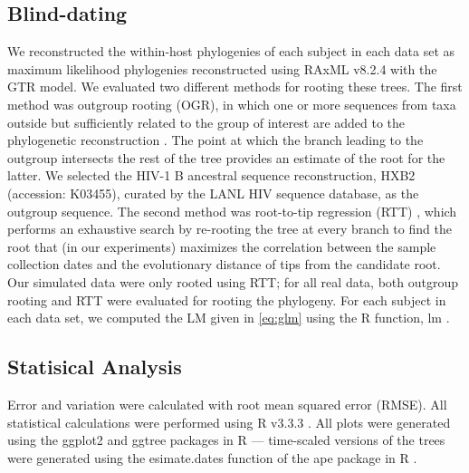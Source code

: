 \documentclass[12pt,onecolumn,twoside]{pnas-new}
\begin{document}
{\subsection*{Blind-dating}
We reconstructed the within-host phylogenies of each subject in each data set as maximum likelihood phylogenies reconstructed using RAxML v8.2.4 \cite{raxml} with the GTR model.
We evaluated two different methods for rooting these trees. 
The first method was outgroup rooting (OGR), in which one or more sequences from taxa outside but sufficiently related to the group of interest are added to the phylogenetic reconstruction \cite{Huelsenbeck02}.
The point at which the branch leading to the outgroup intersects the rest of the tree provides an estimate of the root for the latter.
We selected the HIV-1 B ancestral sequence reconstruction, HXB2 (accession: K03455), curated by the LANL HIV sequence database, as the outgroup sequence.
The second method was root-to-tip regression (RTT) \cite{Korber00}, which performs an exhaustive search by re-rooting the tree at every branch to find the root that (in our experiments) maximizes the correlation between the sample collection dates and the evolutionary distance of tips from the candidate root.
Our simulated data were only rooted using RTT; for all real data, both outgroup rooting and RTT were evaluated for rooting the phylogeny.
For each subject in each data set, we computed the LM given in \cref{eq:glm} using the R function, lm \cite{rscript}.
\subsection*{Statisical Analysis}
Error and variation were calculated with root mean squared error (RMSE).
All statistical calculations were performed using R v3.3.3 \cite{rscript}.
All plots were generated using the ggplot2 and ggtree packages in R \cite{ggplot,ggtree} --- time-scaled versions of the trees were generated using the esimate.dates function of the ape package in R \cite{ape,nodedating}.
}

\showmatmethods{} %





\end{document}
